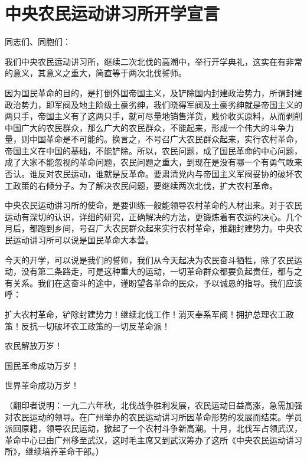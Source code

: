 \section[中央农民运动讲习所开学宣言（一九二六年十月）]{中央农民运动讲习所开学宣言}


同志们、同胞们：


我们中央农民运动讲习所，继续二次北伐的高潮中，举行开学典礼，这实在有非常的意义，其意义之重大，简直等于两次北伐誓师。

因为国民革命的目的，是打倒外国帝国主义，及铲除国内封建政治势力，所谓封建政治势力，即军阀及地主阶级土豪劣绅，我们晓得军阀及土豪劣绅就是帝国主义的两只手，帝国主义有了这两只手，就可尽量地销售洋货，贱价收买原料，从而剥削中国广大的农民群众，那么广大的农民群众，不能起来，形成一个伟大的斗争力量，则中国革命是不可能的。换言之，不号召广大农民群众起来，实行农村革命，帝国主义在中国的基础，不能铲除。所以，农民问题，成了国民革命的中心问题，成了大家不能忽视的革命问题，农民问题之重大，到现在是没有哪一个有勇气敢来否认。谁反对农民运动，谁就是反革命。要肃清党内与帝国主义军阀妥协的破坏农工政策的右倾分子。为了解决农民问题，要继续两次北伐，扩大农村革命。

中央农民运动讲习所的使命，是要训练一般能领导农村革命的人材出来。对于农民运动有深切的认识，详细的研究，正确解决的方法，更锻炼着有农运的决心。几个月后，都跑到乡间，号召广大农民群众起来实行农村革命，推翻封建势力。中央农民运动讲习所可以说是国民革命大本营。

今天的开学，可以说是我们的誓师，我们从今天起决为农民奋斗牺牲，除了农民运动，没有第二条路走，可是这种重大的运动，一切革命群众都要负起责任，都与之有关系。我们在这奋斗的途中，谨盼望各革命的民众，予以诚恳的指导。我们应该呼：

扩大农村革命，铲除封建势力！继续北伐工作！消灭奉系军阀！拥护总理农工政策！反抗一切破坏农工政策的一切反革命派！

农民解放万岁！

国民革命成功万岁！

世界革命成功万岁！


（翻印者说明：一九二六年秋，北伐战争胜利发展，农民运动日益高涨，急需加强对农民运动的领导。在广州举办的农民运动讲习所因革命形势的发展而结束。学员派回原籍，领导农民运动，掀起了一个农村斗争新高潮。十月，北伐军占领武汉，革命中心已由广州移至武汉，这时毛主席又到武汉筹办了这所《中央农民运动讲习所》，继续培养革命干部。）

